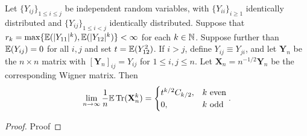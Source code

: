 \begin{proposition}%
  \label{prop:matrix_moments_convergence}
  \notready
  Let $\{Y_{ij}\}_{1\le i\le j}$ be independent random variables, with $\{Y_{ii}\}_{i\ge 1}$ identically distributed and $\{Y_{ij}\}_{1\le i<j}$ identically distributed.  Suppose that $r_k = \max\{{\mathbb{E}}(|Y_{11}|^k),{\mathbb{E}}(|Y_{12}|^k)\} <\infty$ for each $k\in{\mathbb{N}}$.  Suppose further than ${\mathbb{E}}(Y_{ij})=0$ for all $i,j$ and set $t={\mathbb{E}}(Y_{12}^2)$.  If $i>j$, define $Y_{ij} \equiv Y_{ji}$, and let $\mathbf{Y}_n$ be the $n\times n$ matrix with $[\mathbf{Y}_n]_{ij} = Y_{ij}$ for $1\le i,j\le n$.  Let $\mathbf{X}_n = n^{-1/2}\mathbf{Y}_n$ be the corresponding Wigner matrix.  Then
\[
\lim_{n\to\infty} \frac{1}{n}{\mathbb{E}}\operatorname{Tr}(\mathbf{X}_n^k) = \begin{cases}
  t^{k/2}C_{k/2}, & k\text{ even} \\
  0, & k\text{ odd}
\end{cases}.
\]
\end{proposition}

\begin{proof}
\notready
Proof
\end{proof}






















